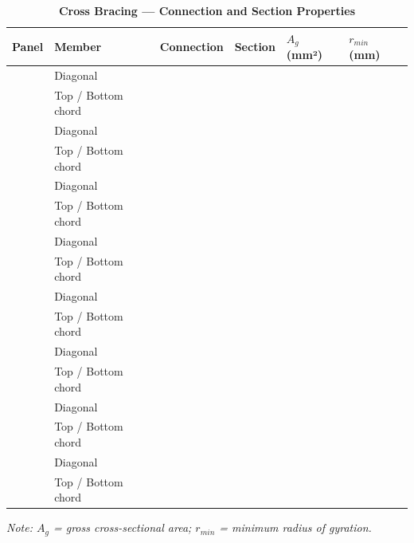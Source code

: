 \documentclass[12pt,a4paper]{report}
\numberwithin{table}{chapter}
\numberwithin{figure}{chapter}
\begin{document}
\vspace{1em}

\vspace{0.4em}
\noindent
\setlength{\tabcolsep}{4pt}
\setlength\LTleft{0pt}
\setlength\LTright{\fill}

\begin{longtable}{|C{2.0cm}|L{2.0cm}|L{2.2cm}|C{2.5cm}|C{2.0cm}|C{2.0cm}|}
\caption{\textbf{Cross Bracing --- Connection and Section Properties}}
\hline
\textbf{Panel} & \textbf{Member} & \textbf{Connection} & \textbf{Section} & \textbf{$A_g$ (mm²)} & \textbf{$r_{min}$ (mm)} \\[6pt]
\hline
{} & Diagonal &  &  &  &  \\[6pt]
 & Top / Bottom chord &  &  &  &  \\[6pt]
\hline
{} & Diagonal &  &  &  &  \\[6pt]
 & Top / Bottom chord &  &  &  &  \\[6pt]
\hline
{} & Diagonal &  &  &  &  \\[6pt]
 & Top / Bottom chord &  &  &  &  \\[6pt]
\hline
{} & Diagonal &  &  &  &  \\[6pt]
 & Top / Bottom chord &  &  &  &  \\[6pt]
\hline
{} & Diagonal &  &  &  &  \\[6pt]
 & Top / Bottom chord &  &  &  &  \\[6pt]
\hline
{} & Diagonal &  &  &  &  \\[6pt]
 & Top / Bottom chord &  &  &  &  \\[6pt]
\hline
{} & Diagonal &  &  &  &  \\[6pt]
 & Top / Bottom chord &  &  &  &  \\[6pt]
\hline
{} & Diagonal &  &  &  &  \\[6pt]
 & Top / Bottom chord &  &  &  &  \\[6pt]
\hline
\end{longtable}
\noindent\textit{Note: $A_g$ = gross cross-sectional area; $r_{min}$ = minimum radius of gyration.}
\end{document}
